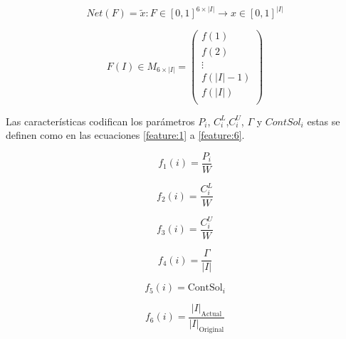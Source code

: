\documentclass[spanish, a4paper, 12pt, openany,final]{book}
\begin{document}
\begin{equation}
	\label{eq:net_matrix}
	Net(F) = \tilde{x}: F\in [0,1]^{6\times |I|} \rightarrow x \in[0,1]^{|I|}
\end{equation}

\begin{equation}
	F(I) \in M_{6 \times |I|} = 
	\left( 
	\begin{matrix}
		f(1)\\
		f(2)\\
		\vdots \\
		f(|I|-1)\\
		f(|I|)\\
	\end{matrix}
	\right)
	\label{eq:feature_matrix}
\end{equation}

Las características codifican los parámetros $P_i$, $C^L_i$,$C^U_i$, $\Gamma$ y $ContSol_i$ estas se definen como en las ecuaciones \eqref{feature:1} a \eqref{feature:6}.


\begin{multicols}{2}
	\label{eq:all_features}
	\begin{equation}
		f_1\left(i\right)   = \frac{P_i}{W}
		\label{feature:1}
	\end{equation}
	
	\begin{equation}
		f_2\left(i\right)   = \frac{C^L_i}{W}
		\label{feature:2}
	\end{equation}
	
	\begin{equation}
		f_3\left(i\right)   = \frac{C^U_i}{W}
		\label{feature:3}
	\end{equation}
	
	\begin{equation}
		f_4\left(i\right)   = \frac{\Gamma}{|I|}
		\label{feature:4}
	\end{equation}
	
	\begin{equation}
		f_5\left(i\right)   = \text{ContSol}_i
		\label{feature:5}
	\end{equation}
	
\begin{equation}
	\label{feature:6}
	f_6(i) = \frac{|I|_{\text{Actual}}}{|I|_\text{Original}}
\end{equation}	
\end{multicols}
\end{document}
